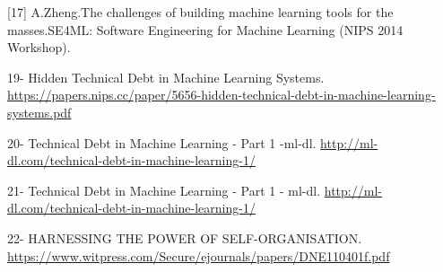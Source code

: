 \documentclass[]{article}
\begin{document}
{[}17{]} A.Zheng.The challenges of building machine learning tools for
the masses.SE4ML: Software Engineering for Machine Learning (NIPS 2014
Workshop).

19- Hidden Technical Debt in Machine Learning Systems.
\url{https://papers.nips.cc/paper/5656-hidden-technical-debt-in-machine-learning-systems.pdf}

20- Technical Debt in Machine Learning - Part 1 -ml-dl.
\url{http://ml-dl.com/technical-debt-in-machine-learning-1/}

21- Technical Debt in Machine Learning - Part 1 - ml-dl.
\url{http://ml-dl.com/technical-debt-in-machine-learning-1/}

22- HARNESSING THE POWER OF SELF-ORGANISATION.
\url{https://www.witpress.com/Secure/ejournals/papers/DNE110401f.pdf}
\end{document}
